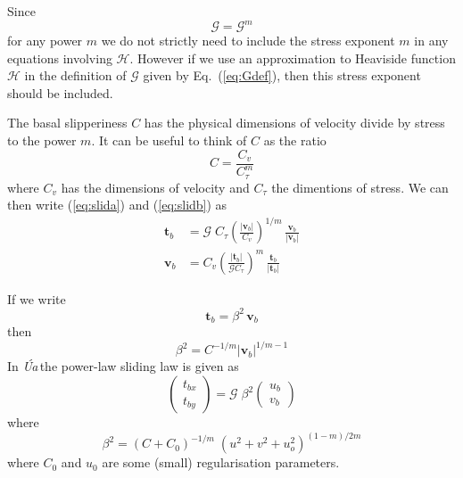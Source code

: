 \documentclass[10pt,a4paper]{book}
\newcommand{\He}{\mathcal{H}}
\newcommand{\G}{\mathcal{G}}
\newcommand{\Ua}{\textsl{\'Ua}\,}
\begin{document}
Since
\[
\G=\G^m
\]
for any power $m$ we do not strictly need to include the stress
exponent $m$ in any equations involving $\He$. However if we use an
approximation to Heaviside function $\He$ in the definition of $\G$
given by Eq.~(\ref{eq:Gdef}), then this stress exponent should be
included.

The basal slipperiness $C$ has the physical dimensions of velocity divide by
stress to the power $m$. It can be useful to think of $C$ as the ratio
\[
C= \frac{C_v}{C_{\tau}^m}
\]
where $C_v$ has the dimensions of velocity and $C_{\tau}$ the
dimentions of stress.  We can then write (\ref{eq:slida}) and
(\ref{eq:slidb}) as
\begin{align}
  \bm{t}_b   & = \G \; C_{\tau} \left ( \frac{| \bm{v}_b|}{C_v} \right )^{1/m} \, \frac{\bm{v}_b}{| \bm{v}_b | } \label{eq:slida1} \\
  \bm{v}_b   & =  C_v  \left ( \frac{ | \bm{t}_b|}{\G C_{\tau}} \right )^m \, \frac{\bm{t}_b}{| \bm{t}_b|}  \label{eq:slidb1} 
\end{align}



If we write
\[ 
\bm{t}_b=\beta^2 \, \bm{v}_b
\]
then
\[
\beta^2=C^{-1/m} | \bm{v}_b|^{1/m-1} 
\]
In  \Ua the power-law sliding law is given as
\[
  \begin{pmatrix}  t_{bx} \\ t_{by}  \end{pmatrix} 
=\G \; \beta^2    \begin{pmatrix}  u_b \\ v_b  \end{pmatrix} 
\]
where
\[
\beta^2=(C+C_0)^{-1/m} \; (u^2+v^2+u_o^2)^{(1-m)/2m}
\]
where $C_0$ and $u_0$ are some (small) regularisation parameters. 
\end{document}
